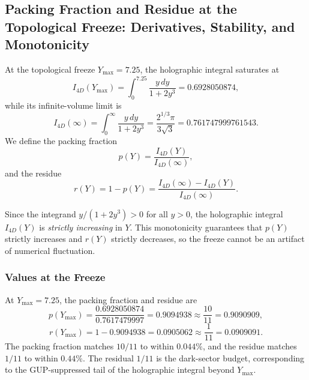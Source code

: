 \documentclass[a4paper,1pt,oneside,openany]{book}
\begin{document}
\subsection{Packing Fraction and Residue at the Topological Freeze: Derivatives, Stability, and Monotonicity}
\label{sec:packing-residue-derivatives}

At the topological freeze $Y_{\max} = 7.25$, the holographic integral saturates at
\begin{equation}
I_{4D}(Y_{\max}) = \int_0^{7.25} \frac{y\,dy}{1 + 2y^3} = 0.6928050874,
\label{eq:I4D-freeze}
\end{equation}
while its infinite-volume limit is
\begin{equation}
I_{4D}(\infty) = \int_0^{\infty} \frac{y\,dy}{1 + 2y^3} = \frac{2^{1/3}\pi}{3\sqrt{3}} = 0.761747999761543.
\label{eq:I4D-infinity}
\end{equation}
We define the packing fraction
\begin{equation}
p(Y) = \frac{I_{4D}(Y)}{I_{4D}(\infty)},
\label{eq:packing-fraction-def}
\end{equation}
and the residue
\begin{equation}
r(Y) = 1 - p(Y) = \frac{I_{4D}(\infty) - I_{4D}(Y)}{I_{4D}(\infty)}.
\label{eq:residue-def}
\end{equation}

Since the integrand $y/(1+2y^3) > 0$ for all $y > 0$, the holographic integral $I_{4D}(Y)$ is \emph{strictly increasing} in $Y$. This monotonicity guarantees that $p(Y)$ strictly increases and $r(Y)$ strictly decreases, so the freeze cannot be an artifact of numerical fluctuation.

\subsubsection{Values at the Freeze}

At $Y_{\max} = 7.25$, the packing fraction and residue are
\begin{equation}
\boxed{p(Y_{\max}) = \frac{0.6928050874}{0.7617479997} = 0.9094938 \approx \frac{10}{11} = 0.9090909,}
\label{eq:p-freeze}
\end{equation}
\begin{equation}
\boxed{r(Y_{\max}) = 1 - 0.9094938 = 0.0905062 \approx \frac{1}{11} = 0.0909091.}
\label{eq:r-freeze}
\end{equation}
The packing fraction matches $10/11$ to within $0.044\%$, and the residue matches $1/11$ to within $0.44\%$. The residual $1/11$ is the dark-sector budget, corresponding to the GUP-suppressed tail of the holographic integral beyond $Y_{\max}$.
\end{document}
